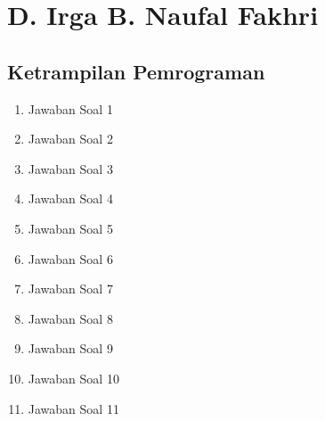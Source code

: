 \section{D. Irga B. Naufal Fakhri}
\subsection{Ketrampilan Pemrograman}

\begin{enumerate}
\item Jawaban Soal 1


\item Jawaban Soal 2


\item Jawaban Soal 3


\item Jawaban Soal 4


\item Jawaban Soal 5


\item Jawaban Soal 6


\item Jawaban Soal 7


\item Jawaban Soal 8


\item Jawaban Soal 9


\item Jawaban Soal 10


\item Jawaban Soal 11


\end{enumerate}
\hfill \break

